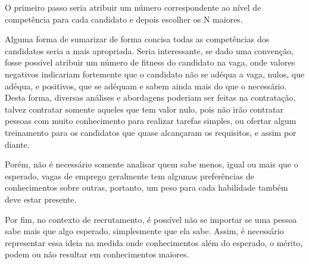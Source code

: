\documentclass[preprint,12pt]{elsarticle}
\begin{document}
O primeiro passo seria atribuir um número correspondente ao nível de competência para cada candidato e depois escolher os N maiores. 

Alguma forma de sumarizar de forma concisa todas as competências dos candidatos seria a mais apropriada. Seria interessante, se dado uma convenção, fosse possível atribuir um número de fitness do candidato na vaga, onde valores negativos indicariam fortemente que o candidato não se adéqua a vaga, nulos, que adéqua, e positivos, que se adéquam e sabem ainda mais do que o necessário. Desta forma, diversas análises e abordagens poderiam ser feitas na contratação, talvez contratar somente aqueles que tem valor nulo, pois não irão contratar pessoas com muito conhecimento para realizar tarefas simples, ou ofertar algum treinamento para os candidatos que quase alcançaram os requisitos, e assim por diante.

Porém, não é necessário somente analisar quem sabe menos, igual ou mais que o esperado, vagas de emprego geralmente tem algumas preferências de conhecimentos sobre outras, portanto, um peso para cada habilidade também deve estar presente. 

Por fim, no contexto de recrutamento, é possível não se importar se uma pessoa sabe mais que algo esperado, simplesmente que ela sabe. Assim, é necessário representar essa ideia na medida onde conhecimentos além do esperado, o mérito, podem ou não resultar em conhecimentos maiores.
\end{document}
